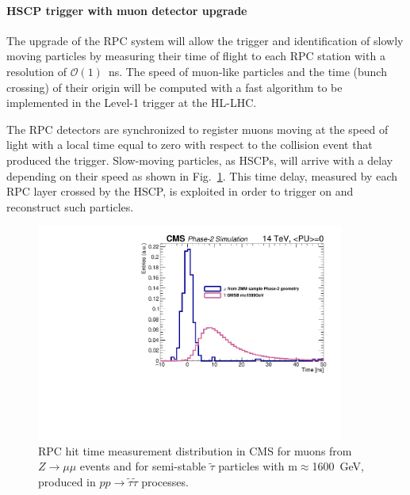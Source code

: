 \paragraph{HSCP trigger with muon detector upgrade}

The upgrade of the RPC system will allow the trigger and identification of slowly moving particles by measuring their time of flight to each RPC station with a resolution of $\mathcal{O}(1)$~ns. The speed of muon-like particles and the time (bunch crossing) of their origin will be computed with a fast algorithm to be implemented in the Level-1 trigger at the HL-LHC.

The RPC detectors are synchronized to register muons moving at the speed of light with a local time equal to zero with respect to the collision event that produced the trigger. Slow-moving particles, as HSCPs, will arrive with a delay depending on their speed as shown in Fig.~\ref{fig:hscp_time}. This time delay, measured by each RPC layer crossed by the HSCP, is exploited in order to trigger on and reconstruct such particles. 

\begin{figure}[t]
\begin{center}
  \includegraphics[width=0.9\textwidth]{figures/HSCP/time.pdf}
  \caption{RPC hit time measurement distribution in CMS for muons from $Z \to \mu\mu$ events and for semi-stable $\tilde \tau$ particles with m$\approx$1600~GeV, produced in $pp \to \tilde \tau \tilde \tau$ processes.}
  \label{fig:hscp_time}
\end{center}
\end{figure}

